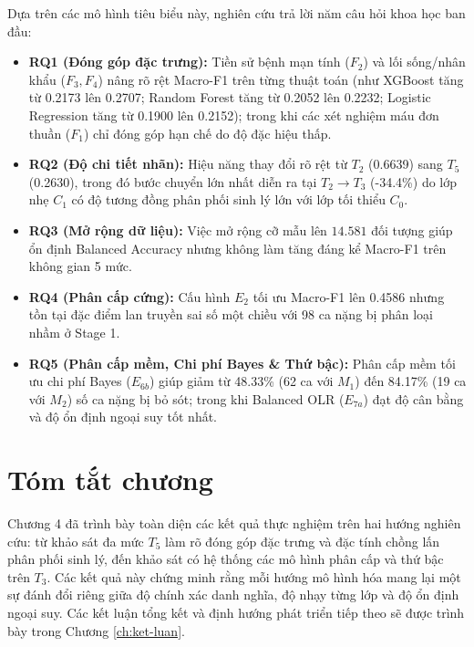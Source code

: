 Dựa trên các mô hình tiêu biểu này, nghiên cứu trả lời năm câu hỏi khoa học ban đầu:
\begin{itemize}
    \item \textbf{RQ1 (Đóng góp đặc trưng):} Tiền sử bệnh mạn tính ($F_2$) và lối sống/nhân khẩu ($F_3, F_4$) nâng rõ rệt Macro-F1 trên từng thuật toán (như XGBoost tăng từ 0.2173 lên 0.2707; Random Forest tăng từ 0.2052 lên 0.2232; Logistic Regression tăng từ 0.1900 lên 0.2152); trong khi các xét nghiệm máu đơn thuần ($F_1$) chỉ đóng góp hạn chế do độ đặc hiệu thấp.
    \item \textbf{RQ2 (Độ chi tiết nhãn):} Hiệu năng thay đổi rõ rệt từ $T_2$ (0.6639) sang $T_5$ (0.2630), trong đó bước chuyển lớn nhất diễn ra tại $T_2 \to T_3$ (-34.4\%) do lớp nhẹ $C_1$ có độ tương đồng phân phối sinh lý lớn với lớp tối thiểu $C_0$.
    \item \textbf{RQ3 (Mở rộng dữ liệu):} Việc mở rộng cỡ mẫu lên $14.581$ đối tượng giúp ổn định Balanced Accuracy nhưng không làm tăng đáng kể Macro-F1 trên không gian 5 mức.
    \item \textbf{RQ4 (Phân cấp cứng):} Cấu hình $E_2$ tối ưu Macro-F1 lên 0.4586 nhưng tồn tại đặc điểm lan truyền sai số một chiều với 98 ca nặng bị phân loại nhầm ở Stage 1.
    \item \textbf{RQ5 (Phân cấp mềm, Chi phí Bayes \& Thứ bậc):} Phân cấp mềm tối ưu chi phí Bayes ($E_{6b}$) giúp giảm từ 48.33\% (62 ca với $M_1$) đến 84.17\% (19 ca với $M_2$) số ca nặng bị bỏ sót; trong khi Balanced OLR ($E_{7a}$) đạt độ cân bằng và độ ổn định ngoại suy tốt nhất.
\end{itemize}

\section{Tóm tắt chương}
\label{sec:tom-tat-chuong-4}

Chương 4 đã trình bày toàn diện các kết quả thực nghiệm trên hai hướng nghiên cứu: từ khảo sát đa mức $T_5$ làm rõ đóng góp đặc trưng và đặc tính chồng lấn phân phối sinh lý, đến khảo sát có hệ thống các mô hình phân cấp và thứ bậc trên $T_3$. Các kết quả này chứng minh rằng mỗi hướng mô hình hóa mang lại một sự đánh đổi riêng giữa độ chính xác danh nghĩa, độ nhạy từng lớp và độ ổn định ngoại suy. Các kết luận tổng kết và định hướng phát triển tiếp theo sẽ được trình bày trong Chương \ref{ch:ket-luan}.
